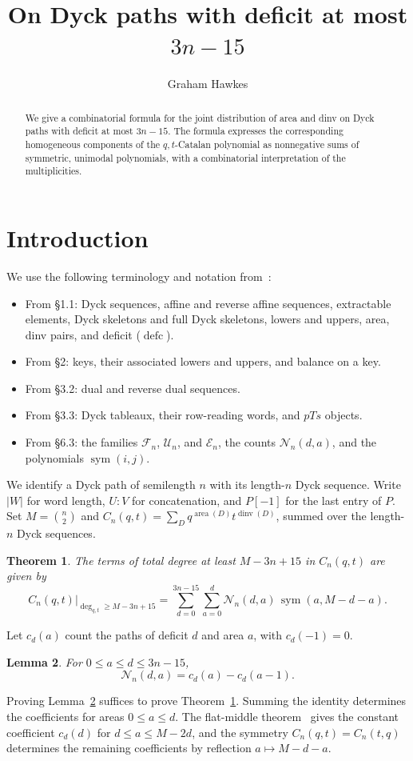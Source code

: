\documentclass[11pt]{article}
\title{On Dyck paths with deficit at most $3n-15$}\author{Graham Hawkes}\date{}
\DeclareMathOperator{\area}{area}\DeclareMathOperator{\dinv}{dinv}
\DeclareMathOperator{\defc}{defc}\DeclareMathOperator{\sym}{sym}
\newtheorem{theorem}{Theorem}\newtheorem{lemma}[theorem]{Lemma}
\begin{document}
\maketitle
\begin{abstract}
We give a combinatorial formula for the joint distribution of area and dinv on Dyck paths with deficit at most $3n-15$. The formula expresses the corresponding homogeneous components of the $q,t$-Catalan polynomial as nonnegative sums of symmetric, unimodal polynomials, with a combinatorial interpretation of the multiplicities.
\end{abstract}

\section{Introduction}
We use the following terminology and notation from~\cite{H}:
\begin{itemize}
\item From \S1.1: Dyck sequences, affine and reverse affine sequences, extractable elements, Dyck skeletons and full Dyck skeletons, lowers and uppers, area, dinv pairs, and deficit ($\defc$).
\item From \S2: keys, their associated lowers and uppers, and balance on a key.
\item From \S3.2: dual and reverse dual sequences.
\item From \S3.3: Dyck tableaux, their row-reading words, and $pTs$ objects.
\item From \S6.3: the families $\mathcal F_n$, $\mathcal U_n$, and $\mathcal E_n$, the counts $\mathcal N_n(d,a)$, and the polynomials $\sym(i,j)$.
\end{itemize}
We identify a Dyck path of semilength $n$ with its length-$n$ Dyck sequence. Write $|W|$ for word length, $U:V$ for concatenation, and $P[-1]$ for the last entry of $P$. Set $M=\binom n2$ and $C_n(q,t)=\sum_D q^{\area(D)}t^{\dinv(D)}$, summed over the length-$n$ Dyck sequences. 

\begin{theorem}\label{main}
The terms of total degree at least $M-3n+15$ in $C_n(q,t)$ are given by
\[
 \left.C_n(q,t)\right|_{\deg_{q,t}\ge M-3n+15}
 =\sum_{d=0}^{3n-15}\sum_{a=0}^{d}\mathcal N_n(d,a)\,\sym(a,M-d-a).
\]
\end{theorem}
Let $c_d(a)$ count the paths of deficit $d$ and area $a$, with $c_d(-1)=0$.
\begin{lemma}\label{first-difference}
For $0\le a\le d\le3n-15$,
\[
 \mathcal N_n(d,a)=c_d(a)-c_d(a-1).
\]
\end{lemma}
Proving Lemma~\ref{first-difference} suffices to prove Theorem~\ref{main}. Summing the identity determines the coefficients for areas $0\le a\le d$. The flat-middle theorem~\cite[Theorem~3.12]{H} gives the constant coefficient $c_d(d)$ for $d\le a\le M-2d$, and the symmetry $C_n(q,t)=C_n(t,q)$~\cite[\S1]{LLL} determines the remaining coefficients by reflection $a\mapsto M-d-a$.
\end{document}
